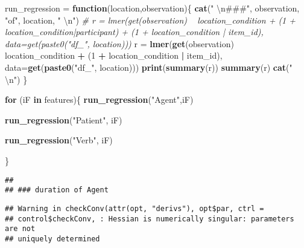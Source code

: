 \documentclass[]{article}
\newenvironment{Shaded}{\begin{snugshade}}{\end{snugshade}}
\newcommand{\CharTok}[1]{\textcolor[rgb]{0.31,0.60,0.02}{#1}}
\newcommand{\CommentTok}[1]{\textcolor[rgb]{0.56,0.35,0.01}{\textit{#1}}}
\newcommand{\ControlFlowTok}[1]{\textcolor[rgb]{0.13,0.29,0.53}{\textbf{#1}}}
\newcommand{\DataTypeTok}[1]{\textcolor[rgb]{0.13,0.29,0.53}{#1}}
\newcommand{\DecValTok}[1]{\textcolor[rgb]{0.00,0.00,0.81}{#1}}
\newcommand{\KeywordTok}[1]{\textcolor[rgb]{0.13,0.29,0.53}{\textbf{#1}}}
\newcommand{\NormalTok}[1]{#1}
\newcommand{\OperatorTok}[1]{\textcolor[rgb]{0.81,0.36,0.00}{\textbf{#1}}}
\newcommand{\StringTok}[1]{\textcolor[rgb]{0.31,0.60,0.02}{#1}}
\begin{document}
\begin{Shaded}
\begin{Highlighting}[]
\NormalTok{run_regression =}\StringTok{ }\ControlFlowTok{function}\NormalTok{(location,observation)\{}
\KeywordTok{cat}\NormalTok{(}\StringTok{"  }\CharTok{\textbackslash{}n}\StringTok{###"}\NormalTok{, observation, }\StringTok{"of"}\NormalTok{, location, }\StringTok{"  }\CharTok{\textbackslash{}n}\StringTok{"}\NormalTok{)}
    \CommentTok{# r = lmer(get(observation) ~ location_condition + (1 + location_condition|participant) + (1 + location_condition | item_id), data=get(paste0("df_", location)))}
\NormalTok{        r =}\StringTok{ }\KeywordTok{lmer}\NormalTok{(}\KeywordTok{get}\NormalTok{(observation) }\OperatorTok{~}\StringTok{ }\NormalTok{location_condition  }\OperatorTok{+}\StringTok{ }\NormalTok{(}\DecValTok{1} \OperatorTok{+}\StringTok{ }\NormalTok{location_condition }\OperatorTok{|}\StringTok{ }\NormalTok{item_id), }\DataTypeTok{data=}\KeywordTok{get}\NormalTok{(}\KeywordTok{paste0}\NormalTok{(}\StringTok{"df_"}\NormalTok{, location)))}
  \KeywordTok{print}\NormalTok{(}\KeywordTok{summary}\NormalTok{(r))}
  \KeywordTok{summary}\NormalTok{(r)}
  \KeywordTok{cat}\NormalTok{(}\StringTok{"  }\CharTok{\textbackslash{}n}\StringTok{"}\NormalTok{)}
\NormalTok{\}}



\ControlFlowTok{for}\NormalTok{ (iF }\ControlFlowTok{in}\NormalTok{ features)\{}
  \KeywordTok{run_regression}\NormalTok{(}\StringTok{"Agent"}\NormalTok{,iF)}

  
  \KeywordTok{run_regression}\NormalTok{(}\StringTok{"Patient"}\NormalTok{, iF)}

  \KeywordTok{run_regression}\NormalTok{(}\StringTok{"Verb"}\NormalTok{, iF)}

  
  
\NormalTok{\}}
\end{Highlighting}
\end{Shaded}

\begin{verbatim}
##   
## ### duration of Agent
\end{verbatim}

\begin{verbatim}
## Warning in checkConv(attr(opt, "derivs"), opt$par, ctrl =
## control$checkConv, : Hessian is numerically singular: parameters are not
## uniquely determined
\end{verbatim}
\end{document}
